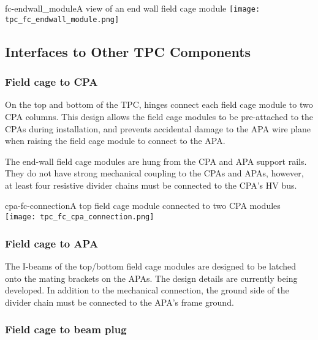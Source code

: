 \begin{cdrfigure}{fc-endwall_module}{A view of an end wall field cage module}
\texttt{[image: tpc\_fc\_endwall\_module.png]}
\end{cdrfigure}


\subsection{Interfaces to Other TPC Components}

\subsubsection{Field cage to CPA}

On the top and bottom of the TPC, hinges connect each field cage module to two CPA columns.  This design allows the field cage modules to be pre-attached to the CPAs during installation, and prevents accidental damage to the APA wire plane when raising the field cage module to connect %
to the APA.

The end-wall field cage modules are hung from the CPA and APA support rails.  They do not have strong mechanical coupling to the CPAs and APAs, however, at least four resistive divider chains must be connected to the CPA's HV bus.

\begin{cdrfigure}{cpa-fc-connection}{A top field cage module connected to two CPA modules}
\texttt{[image: tpc\_fc\_cpa\_connection.png]}
\end{cdrfigure}


\subsubsection{Field cage to APA}

The I-beams of the top/bottom field cage modules are designed to be latched onto the mating brackets on the APAs.  The design details are currently being developed. %
In addition to the mechanical connection, the ground side of the divider chain must be connected to the APA's frame ground. %


\subsubsection{Field cage to beam plug}


